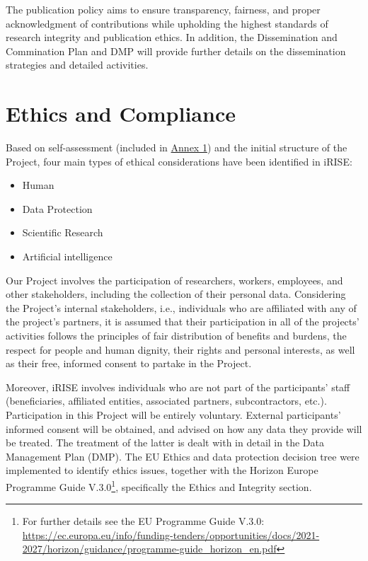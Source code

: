 \documentclass[
]{article}
\providecommand{\tightlist}{%
  \setlength{\itemsep}{0pt}\setlength{\parskip}{0pt}}
\begin{document}
The publication policy aims to ensure transparency, fairness, and proper acknowledgment of contributions while upholding the highest standards of research integrity and publication ethics. In addition, the Dissemination and Commination Plan and DMP will provide further details on the dissemination strategies and detailed activities.

\hypertarget{ethics-and-compliance}{%
\section{\texorpdfstring{\textbf{Ethics and Compliance}}{Ethics and Compliance}}\label{ethics-and-compliance}}

Based on self-assessment (included in \protect\hyperlink{appendix-1-ethical-self-assessment-and-ethical-risks-identification}{Annex 1}) and the initial structure of the Project, four main types of ethical considerations have been identified in iRISE:

\begin{itemize}
\tightlist
\item
  Human\\
\item
  Data Protection
\item
  Scientific Research\\
\item
  Artificial intelligence
\end{itemize}

Our Project involves the participation of researchers, workers, employees, and other stakeholders, including the collection of their personal data. Considering the Project's internal stakeholders, i.e., individuals who are affiliated with any of the project's partners, it is assumed that their participation in all of the projects' activities follows the principles of fair distribution of benefits and burdens, the respect for people and human dignity, their rights and personal interests, as well as their free, informed consent to partake in the Project.

Moreover, iRISE involves individuals who are not part of the participants' staff (beneficiaries, affiliated entities, associated partners, subcontractors, etc.). Participation in this Project will be entirely voluntary. External participants' informed consent will be obtained, and advised on how any data they provide will be treated. The treatment of the latter is dealt with in detail in the Data Management Plan (DMP). The EU Ethics and data protection decision tree were implemented to identify ethics issues, together with the Horizon Europe Programme Guide V.3.0\footnote{For further details see the EU Programme Guide V.3.0: \url{https://ec.europa.eu/info/funding-tenders/opportunities/docs/2021-2027/horizon/guidance/programme-guide_horizon_en.pdf}}, specifically the Ethics and Integrity section.
\end{document}
